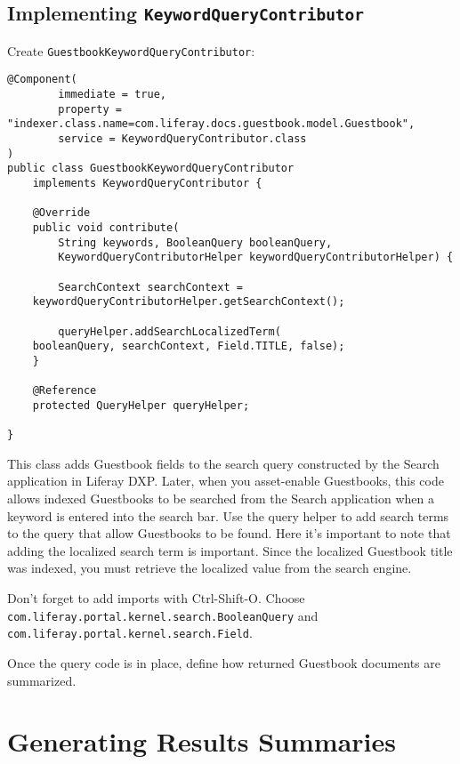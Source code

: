 \section{\texorpdfstring{Implementing
\texttt{KeywordQueryContributor}}{Implementing KeywordQueryContributor}}\label{implementing-keywordquerycontributor}

Create \texttt{GuestbookKeywordQueryContributor}:

\begin{verbatim}
@Component(
        immediate = true,
        property = "indexer.class.name=com.liferay.docs.guestbook.model.Guestbook",
        service = KeywordQueryContributor.class
)
public class GuestbookKeywordQueryContributor
    implements KeywordQueryContributor {

    @Override
    public void contribute(
        String keywords, BooleanQuery booleanQuery,
        KeywordQueryContributorHelper keywordQueryContributorHelper) {

        SearchContext searchContext =
    keywordQueryContributorHelper.getSearchContext();

        queryHelper.addSearchLocalizedTerm(
    booleanQuery, searchContext, Field.TITLE, false);
    }

    @Reference
    protected QueryHelper queryHelper;

}
\end{verbatim}

This class adds Guestbook fields to the search query constructed by the
Search application in Liferay DXP. Later, when you asset-enable
Guestbooks, this code allows indexed Guestbooks to be searched from the
Search application when a keyword is entered into the search bar. Use
the query helper to add search terms to the query that allow Guestbooks
to be found. Here it's important to note that adding the localized
search term is important. Since the localized Guestbook title was
indexed, you must retrieve the localized value from the search engine.

Don't forget to add imports with Ctrl-Shift-O. Choose
\texttt{com.liferay.portal.kernel.search.BooleanQuery} and
\texttt{com.liferay.portal.kernel.search.Field}.

Once the query code is in place, define how returned Guestbook documents
are summarized.

\chapter{Generating Results
Summaries}\label{generating-results-summaries}

